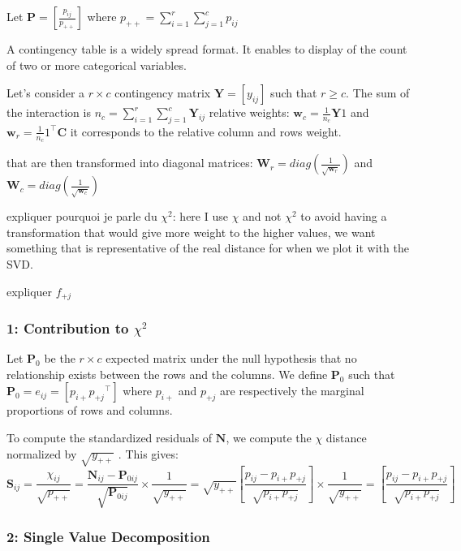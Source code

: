 Let $\textbf{P} = \left[ \frac{p_{ij}}{p_{++}} \right]$ where $p_{++}=\sum_{i=1}^{r}\sum_{j=1}^{c}p_{ij}$

A contingency table is a widely spread format. It enables to display of the count of two or more categorical variables.

Let's consider a $r \times c$ contingency matrix $\textbf{Y} = [y_{ij}]$ such that $r\geq c$.
The sum of the interaction is $n_c = \sum_{i=1}^{r} \sum_{j=1}^{c} \textbf{Y}_{ij}$ 
relative weights: $\textbf{w}_c = \frac{1}{n_c} \textbf{Y}1$ and $\textbf{w}_r = \frac{1}{n_c}1^\intercal\textbf{C}$ it corresponds to the relative column and rows weight.

that are then transformed into diagonal matrices: $\textbf{W}_r = diag\left(\frac{1}{\sqrt{\textbf{w}_r}}\right)$ and $\textbf{W}_c = diag\left(\frac{1}{\sqrt{\textbf{w}_c}}\right)$



expliquer pourquoi je parle du $\chi^2$:
here I use $\chi$ and not $\chi^2$ to avoid having a transformation that would give more weight to the higher values, we want something that is representative of the real distance for when we plot it with the SVD.

expliquer ${f_{+j}}$


\subsubsection{1: Contribution to $\chi^2$}

Let $\textbf{P}_0$ be the $r\times c$ expected matrix under the null hypothesis that no relationship exists between the rows and the columns. We define $\textbf{P}_0$ such that $\textbf{P}_0 = e_{ij} = [p_{i+}{p_{+j}}^\intercal]$ where \(p_{i+}\) and \(p_{+j}\) are respectively the marginal proportions of rows and columns.

To compute the standardized residuals of $\textbf{N}$, we compute the $\chi$ distance normalized by $\sqrt{y_{++}}$ . This gives:
$$
\textbf{S}_{ij} = \frac{\chi_{ij}}{\sqrt{p_{++}}} = \frac{\textbf{N}_{ij} -  \textbf{P}_{0 ij}}{\sqrt{\textbf{P}_{0 ij}}} \times \frac{1}{\sqrt{y_{++}}} = \sqrt{y_{++}} \left[ \frac{p_{ij} - p_{i+}p_{+j}}{\sqrt{p_{i+}p_{+j}}} \right] \times \frac{1}{\sqrt{y_{++}}} = \left[ \frac{p_{ij} - p_{i+}p_{+j}}{\sqrt{p_{i+}p_{+j}}} \right]
$$ 

\subsubsection{2: Single Value Decomposition}

